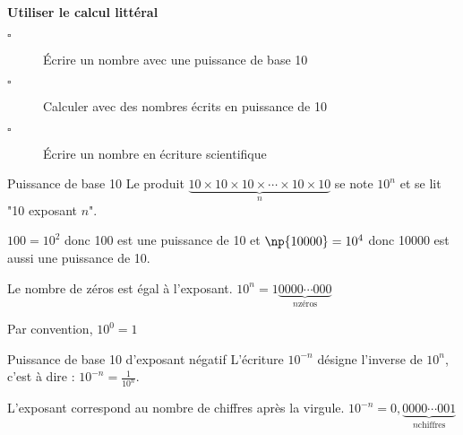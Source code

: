 \begin{titre}

\end{titre}


\begin{CpsCol}
\textbf{Utiliser le calcul littéral}
\begin{description}
\item[$\square$] Écrire un nombre avec une puissance de base 10
\item[$\square$] Calculer avec des nombres écrits en puissance de 10
\item[$\square$] Écrire un nombre en écriture scientifique
\end{description}
\end{CpsCol}



\begin{DefT}{Puissance de base 10}
Le produit $\underbrace{10 \times 10 \times 10 \times \cdots \times 10 \times 10}_n$ se note $10^n$ et se lit "10 exposant $n$". 
\end{DefT}

\begin{Ex}
$100 = 10^2$ donc 100 est une puissance de 10 et $\np{10000} = 10^4$ donc 10000 est aussi une puissance de 10. 
\end{Ex}

\begin{Rq}
Le nombre de zéros est égal à l'exposant. $10^n= 1\underbrace{0000 \cdots 000}_{n \text{zéros}}$
\end{Rq}

\begin{Def}
Par convention, $10^0=1$
\end{Def}

\begin{minipage}[t]{0.48\linewidth}

\end{minipage}
\hfill
\begin{minipage}[t]{0.48\linewidth}
\end{minipage}




\begin{DefT}{Puissance de base 10 d'exposant négatif}
L'écriture $10^{-n}$ désigne l'inverse de $10^n$, c'est à dire : $10^{-n}= \frac{1}{10^n}$. 
\end{DefT}


\begin{Rq}
L'exposant correspond au nombre de chiffres après la virgule. $10^{-n}= 0,\underbrace{0000 \cdots 001}_{n \text{chiffres}}$
\end{Rq}


\begin{minipage}[t]{0.49\linewidth}
\end{minipage}
\hfill
\begin{minipage}[t]{0.49\linewidth}
\end{minipage}




